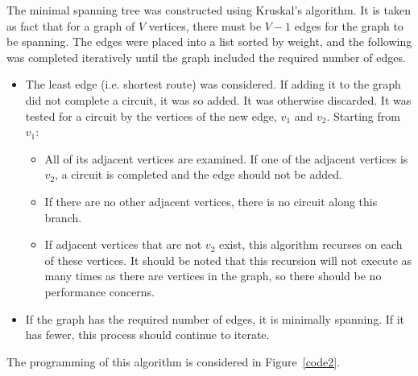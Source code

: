\documentclass{article}
\begin{document}
The minimal spanning tree was constructed using Kruskal's algorithm.  It is taken as fact that for a graph of $V$ vertices, there must be $V - 1$ edges for the graph to be spanning.  The edges were placed into a list sorted by weight, and the following was completed iteratively until the graph included the required number of edges.
    \begin{itemize} 
    \item The least edge (i.e. shortest route) was considered.  If adding it to the graph did not complete a circuit, it was so added.  It was otherwise discarded.  It was tested for a circuit by the vertices of the new edge, $v_1$ and $v_2$.  Starting from $v_1$:
        \begin{itemize}
        \item All of its adjacent vertices are examined.  If one of the adjacent vertices is $v_2$, a circuit is completed and the edge should not be added.  
        \item If there are no other adjacent vertices, there is no circuit along this branch.
        \item If adjacent vertices that are not $v_2$ exist, this algorithm recurses on each of these vertices.  It should be noted that this recursion will not execute as many times as there are vertices in the graph, so there should be no performance concerns.
        \end{itemize}
    \item If the graph has the required number of edges, it is minimally spanning.  If it has fewer, this process should continue to iterate.
    \end{itemize}
The programming of this algorithm is considered in Figure~\ref{code2}.
\end{document}
